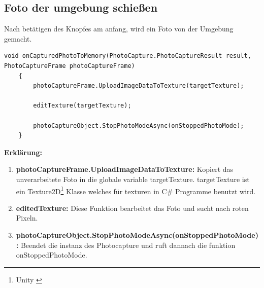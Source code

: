 \subsection*{Foto der umgebung schießen}
Nach betätigen des Knopfes am anfang, wird ein Foto von der Umgebung gemacht.
\begin{lstlisting}[style=csharp, caption={}, label=code:onCapturedPhotoToMemory]
void onCapturedPhotoToMemory(PhotoCapture.PhotoCaptureResult result, PhotoCaptureFrame photoCaptureFrame)
    {
        photoCaptureFrame.UploadImageDataToTexture(targetTexture);

        editTexture(targetTexture);

        photoCaptureObject.StopPhotoModeAsync(onStoppedPhotoMode);
    }
\end{lstlisting}
\textbf{Erklärung:}
\begin{enumerate}
    \item \textbf{photoCaptureFrame.UploadImageDataToTexture:} Kopiert das unverarbeitete Foto in die globale variable targetTexture. targetTexture ist ein Texture2D\footnote{Unity \cite{Texture2D}} Klasse welches für texturen in C# Programme benutzt wird.
    \item \textbf{editedTexture:} Diese Funktion bearbeitet das Foto und sucht nach roten Pixeln.
    \item \textbf{photoCaptureObject.StopPhotoModeAsync(onStoppedPhotoMode):} Beendet die instanz des Photocapture und ruft dannach die funktion onStoppedPhotoMode.
\end{enumerate}

